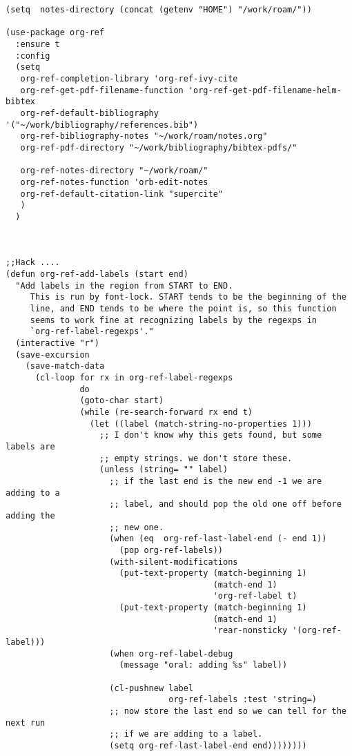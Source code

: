 \documentclass[12pt]{article}
\begin{document}
\begin{verbatim}
(setq  notes-directory (concat (getenv "HOME") "/work/roam/"))

(use-package org-ref
  :ensure t
  :config
  (setq
   org-ref-completion-library 'org-ref-ivy-cite
   org-ref-get-pdf-filename-function 'org-ref-get-pdf-filename-helm-bibtex
   org-ref-default-bibliography '("~/work/bibliography/references.bib")
   org-ref-bibliography-notes "~/work/roam/notes.org"
   org-ref-pdf-directory "~/work/bibliography/bibtex-pdfs/"

   org-ref-notes-directory "~/work/roam/"
   org-ref-notes-function 'orb-edit-notes
   org-ref-default-citation-link "supercite"
   )
  )



;;Hack ....
(defun org-ref-add-labels (start end)
  "Add labels in the region from START to END.
     This is run by font-lock. START tends to be the beginning of the
     line, and END tends to be where the point is, so this function
     seems to work fine at recognizing labels by the regexps in
     `org-ref-label-regexps'."
  (interactive "r")
  (save-excursion
    (save-match-data
      (cl-loop for rx in org-ref-label-regexps
               do
               (goto-char start)
               (while (re-search-forward rx end t)
                 (let ((label (match-string-no-properties 1)))
                   ;; I don't know why this gets found, but some labels are
                   ;; empty strings. we don't store these.
                   (unless (string= "" label)
                     ;; if the last end is the new end -1 we are adding to a
                     ;; label, and should pop the old one off before adding the
                     ;; new one.
                     (when (eq  org-ref-last-label-end (- end 1))
                       (pop org-ref-labels))
                     (with-silent-modifications
                       (put-text-property (match-beginning 1)
                                          (match-end 1)
                                          'org-ref-label t)
                       (put-text-property (match-beginning 1)
                                          (match-end 1)
                                          'rear-nonsticky '(org-ref-label)))
                     (when org-ref-label-debug
                       (message "oral: adding %s" label))

                     (cl-pushnew label
                                 org-ref-labels :test 'string=)
                     ;; now store the last end so we can tell for the next run
                     ;; if we are adding to a label.
                     (setq org-ref-last-label-end end))))))))

\end{verbatim}
\end{document}
